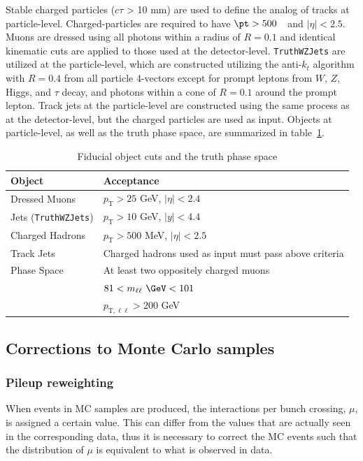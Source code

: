 Stable charged particles ($c\tau$ > 10 mm) are used to define the analog of tracks at particle-level. Charged-particles are required to have $\pt > 500$~\MeV~and $|\eta|<2.5$.
Muons are dressed using all photons within a radius of $R=0.1$ and identical kinematic cuts are applied to those used at the detector-level.
\texttt{TruthWZJets} are utilized at the particle-level, which are constructed utilizing the anti-$k_t$ algorithm with $R=0.4$ from all particle 4-vectors except for prompt leptons from $W$, $Z$, Higgs, and $\tau$ decay, and photons within a cone of $R=0.1$ around the prompt lepton.
Track jets at the particle-level are constructed using the same process as at the detector-level, but the charged particles are used as input.
Objects at particle-level, as well as the truth phase space, are summarized in table~\ref{tab:PLObjCuts}.

\begin{table}[h!]
    \centering
    \begin{tabular}{l|l}
    \hline
    \textbf{Object} & \textbf{Acceptance} \\ \hline
    Dressed Muons & $p_\text{T} > 25$ GeV, $|\eta| < 2.4$ \\\hline
    Jets (\texttt{TruthWZJets}) & $p_\text{T} > 10$ GeV, $|y|<4.4$ \\\hline
    Charged Hadrons & $p_\text{T}>500$ MeV, $|\eta|<2.5$  \\ \hline
    Track Jets & Charged hadrons used as input must pass above criteria \\ \hline
    Phase Space & At least two oppositely charged muons \\
    & $81<m_{\ell\ell}~\GeV<101$ \\
    & $p_{\text{T},\ell\ell}>200$ GeV \\ \hline
    \end{tabular}
    \caption{Fiducial object cuts and the truth phase space}
    \label{tab:PLObjCuts}
\end{table}

\subsection{Corrections to Monte Carlo samples}
\label{subsec:MCCorr}
\subsubsection{Pileup reweighting}
\label{subsec:PRW}
When events in MC samples are produced, the interactions per bunch crossing, $\mu$, is assigned a certain value. This can differ from the values that are actually seen in the corresponding data, thus it is
necessary to correct the MC events such that the distribution of $\mu$ is equivalent to what is observed in data.

